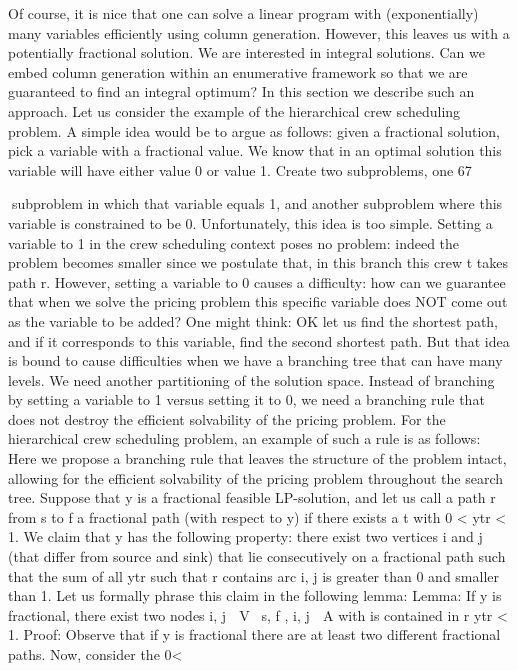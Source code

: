 Of course, it is nice that one can solve a linear program with (exponentially) many variables efficiently
using column generation. However, this leaves us with a potentially fractional solution. We are interested
in integral solutions. Can we embed column generation within an enumerative framework so that we are
guaranteed to find an integral optimum? In this section we describe such an approach.
Let us consider the example of the hierarchical crew scheduling problem. A simple idea would be to
argue as follows: given a fractional solution, pick a variable with a fractional value. We know that
in an optimal solution this variable will have either value 0 or value 1. Create two subproblems, one
67

subproblem in which that variable equals 1, and another subproblem where this variable is constrained to
be 0. Unfortunately, this idea is too simple. Setting a variable to 1 in the crew scheduling context poses
no problem: indeed the problem becomes smaller since we postulate that, in this branch this crew t takes
path r. However, setting a variable to 0 causes a difficulty: how can we guarantee that when we solve
the pricing problem this specific variable does NOT come out as the variable to be added? One might
think: OK let us find the shortest path, and if it corresponds to this variable, find the second shortest
path. But that idea is bound to cause difficulties when we have a branching tree that can have many
levels.
We need another partitioning of the solution space. Instead of branching by setting a variable to 1 versus
setting it to 0, we need a branching rule that does not destroy the efficient solvability of the pricing
problem. For the hierarchical crew scheduling problem, an example of such a rule is as follows: Here
we propose a branching rule that leaves the structure of the problem intact, allowing for the efficient
solvability of the pricing problem throughout the search tree.
Suppose that y is a fractional feasible LP-solution, and let us call a path r from s to f a fractional path
(with respect to y) if there exists a t with 0 < ytr < 1. We claim that y has the following property: there
exist two vertices i and j (that differ from source and sink) that lie consecutively on a fractional path
such that the sum of all ytr such that r contains arc {i, j} is greater than 0 and smaller than 1. Let us
formally phrase this claim in the following lemma:
Lemma: If y is fractional, there exist two nodes i, j ∈ V \ {s, f }, {i, j} ∈ A with
is contained in r ytr < 1.
Proof: Observe that if y is fractional there are at least two different fractional paths. Now, consider the
0<

